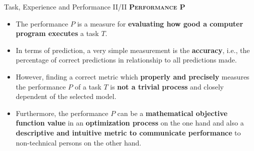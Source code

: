 \documentclass[main.tex]{subfiles}
\begin{document}
    \begin{frame}{Task, Experience and Performance II/II}
        \alert{\textsc{\textbf{Performance P}}}
        \vspace{-1mm}
        \begin{itemize}
            \item The performance $P$ is a measure for \textbf{evaluating how good a computer program executes} a task $T$.
            \item In terms of prediction, a very simple measurement is the \textbf{accuracy}, i.e., the percentage of correct predictions in relationship to all predictions made.
            \item However, finding a correct metric which \textbf{properly and precisely} measures the performance $P$  of a task $T$ is \textbf{not a trivial process} and closely dependent of the selected model.
            \item Furthermore, the performance $P$ can be a\textbf{ mathematical objective function value} in an \textbf{optimization process} on the one hand and also a \textbf{descriptive and intuitive metric to communicate performance} to non-technical persons on the other hand.
        \end{itemize}
    \end{frame}
\end{document}
